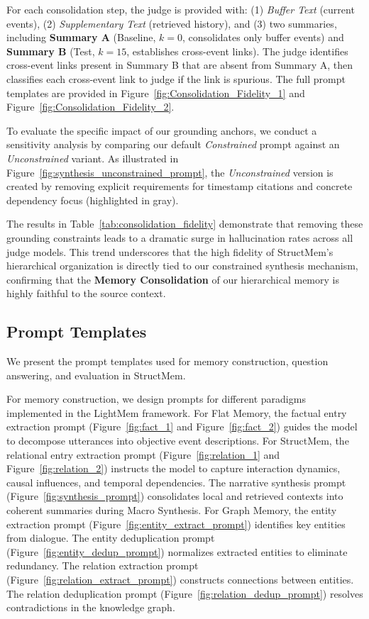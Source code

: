 For each consolidation step, the judge is provided with: (1) \textit{Buffer Text} (current events), (2) \textit{Supplementary Text} (retrieved history), and (3) two summaries, including \textbf{Summary A} (Baseline, $k=0$, consolidates only buffer events) and \textbf{Summary B} (Test, $k=15$, establishes cross-event links). The judge identifies cross-event links present in Summary B that are absent from Summary A, then classifies each cross-event link to judge if the link is spurious. The full prompt templates are provided in Figure~\ref{fig:Consolidation_Fidelity_1} and Figure~\ref{fig:Consolidation_Fidelity_2}.

To evaluate the specific impact of our grounding anchors, we conduct a sensitivity analysis by comparing our default \textit{Constrained} prompt against an \textit{Unconstrained} variant. As illustrated in Figure~\ref{fig:synthesis_unconstrained_prompt}, the \textit{Unconstrained} version is created by removing explicit requirements for timestamp citations and concrete dependency focus (highlighted in gray).

The results in Table~\ref{tab:consolidation_fidelity} demonstrate that removing these grounding constraints leads to a dramatic surge in hallucination rates across all judge models. This trend underscores that the high fidelity of StructMem's hierarchical organization is directly tied to our constrained synthesis mechanism, confirming that the \textbf{Memory Consolidation} of our hierarchical memory is highly faithful to the source context.

\subsection{Prompt Templates}\label{appendix:prompts}
We present the prompt templates used for memory construction, question answering, and evaluation in StructMem.

For memory construction, we design prompts for different paradigms implemented in the LightMem framework. For Flat Memory, the factual entry extraction prompt (Figure~\ref{fig:fact_1} and Figure~\ref{fig:fact_2}) guides the model to decompose utterances into objective event descriptions. 
For StructMem, the relational entry extraction prompt (Figure~\ref{fig:relation_1} and Figure~\ref{fig:relation_2}) instructs the model to capture interaction dynamics, causal influences, and temporal dependencies. The narrative synthesis prompt (Figure~\ref{fig:synthesis_prompt}) consolidates local and retrieved contexts into coherent summaries during Macro Synthesis. For Graph Memory, the entity extraction prompt (Figure~\ref{fig:entity_extract_prompt}) identifies key entities from dialogue. The entity deduplication prompt (Figure~\ref{fig:entity_dedup_prompt}) normalizes extracted entities to eliminate redundancy. The relation extraction prompt (Figure~\ref{fig:relation_extract_prompt}) constructs connections between entities. The relation deduplication prompt (Figure~\ref{fig:relation_dedup_prompt}) resolves contradictions in the knowledge graph.

